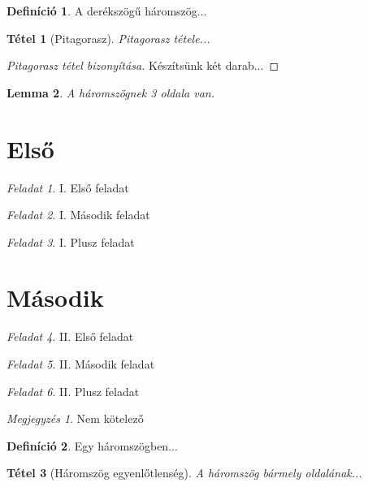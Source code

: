 \documentclass{article}
\theoremstyle{plain}
\newtheorem{tet}{Tétel}
\newtheorem{lem}[tet]{Lemma}
\theoremstyle{definition}
\newtheorem{defin}{Definíció}
\theoremstyle{remark}
\newtheorem{fld}{Feladat}[section]
\newtheorem*{rem}{Megjegyzés}
\begin{document}
    \begin{defin}
        A derékszögű háromszög...
    \end{defin}
    
    \begin{tet}[Pitagorasz]
        Pitagorasz tétele...
    \end{tet}
    
    \begin{proof}[Pitagorasz tétel bizonyítása]
        Készítsünk két darab... \qedhere
    \end{proof}
    
    \begin{lem}
        A háromszögnek 3 oldala van.
    \end{lem}
    
    
    \section{Első}
    
        \begin{fld}
            I. Első feladat
        \end{fld}
    
        \begin{fld}
            I. Második feladat
        \end{fld}
        
        \begin{fld}
            I. Plusz feladat
        \end{fld}
        
    
    \section{Második}
    
        \begin{fld}
            II. Első feladat
        \end{fld}
    
        \begin{fld}
            II. Második feladat
        \end{fld}
        
        \begin{fld}
            II. Plusz feladat
        \end{fld}
        
        \begin{rem}
            Nem kötelező
        \end{rem}
        
        
        \begin{defin}
            Egy háromszögben...
        \end{defin}
    
        \begin{tet}[Háromszög egyenlőtlenség]
             A háromszög bármely oldalának...
        \end{tet}
\end{document}
